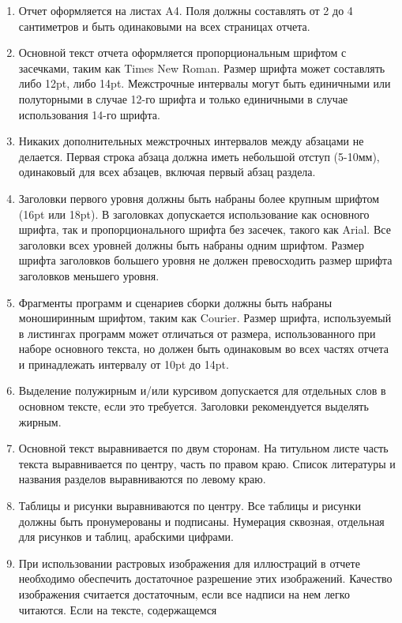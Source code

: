 \documentclass[a4paper,12pt,titlepage,finall]{article}
\begin{document}
\begin{enumerate}
\item Отчет оформляется на листах A4. Поля должны составлять от 2 до 4
    сантиметров и быть одинаковыми на всех страницах отчета.
\item Основной текст отчета оформляется пропорциональным шрифтом с засечками,
    таким как Times New Roman. Размер шрифта может составлять либо 12pt, либо 14pt.
    Межстрочные интервалы могут быть единичными или полуторными в случае 12-го шрифта
    и только единичными в случае использования 14-го шрифта.
\item Никаких дополнительных межстрочных интервалов между абзацами не делается.
    Первая строка абзаца должна иметь небольшой отступ (5-10мм), одинаковый для
    всех абзацев, включая первый абзац раздела.
\item Заголовки первого уровня должны быть набраны более крупным шрифтом (16pt или 18pt).
    В заголовках допускается использование как основного шрифта, так и пропорционального
    шрифта без засечек, такого как Arial. Все заголовки всех уровней должны быть набраны
    одним шрифтом. Размер шрифта заголовков большего уровня не должен превосходить размер
    шрифта заголовков меньшего уровня.
\item Фрагменты программ и сценариев сборки должны быть набраны моноширинным шрифтом, таким
    как Courier. Размер шрифта, используемый в листингах программ может отличаться от размера,
    использованного при наборе основного текста, но должен быть одинаковым во всех частях
    отчета и принадлежать интервалу от 10pt до 14pt.
\item Выделение полужирным и/или курсивом допускается для отдельных слов в основном тексте,
    если это требуется. Заголовки рекомендуется выделять жирным.
\item Основной текст выравнивается по двум сторонам. На титульном листе часть текста
    выравнивается по центру, часть по правом краю. Список литературы и названия разделов 
    выравниваются по левому краю.
\item Таблицы и рисунки выравниваются по центру. Все таблицы и рисунки должны быть пронумерованы
    и подписаны. Нумерация сквозная, отдельная для рисунков и таблиц, арабскими цифрами.
\item При использовании растровых изображения для иллюстраций в отчете
    необходимо обеспечить достаточное разрешение этих изображений. Качество изображения
    считается достаточным, если все надписи на нем легко читаются. Если на тексте, содержащемся

\end{enumerate}
\end{document}
